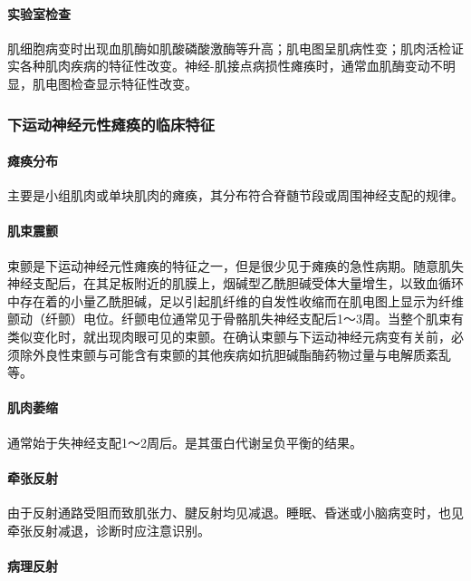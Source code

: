 \paragraph{实验室检查}

肌细胞病变时出现血肌酶如肌酸磷酸激酶等升高；肌电图呈肌病性变；肌肉活检证实各种肌肉疾病的特征性改变。神经-肌接点病损性瘫痪时，通常血肌酶变动不明显，肌电图检查显示特征性改变。

\subsubsection{下运动神经元性瘫痪的临床特征}

\paragraph{瘫痪分布}

主要是小组肌肉或单块肌肉的瘫痪，其分布符合脊髄节段或周围神经支配的规律。

\paragraph{肌束震颤}

束颤是下运动神经元性瘫痪的特征之一，但是很少见于瘫痪的急性病期。随意肌失神经支配后，在其足板附近的肌膜上，烟碱型乙酰胆碱受体大量增生，以致血循环中存在着的小量乙酰胆碱，足以引起肌纤维的自发性收缩而在肌电图上显示为纤维颤动（纤颤）电位。纤颤电位通常见于骨骼肌失神经支配后1～3周。当整个肌束有类似变化时，就出现肉眼可见的束颤。在确认束颤与下运动神经元病变有关前，必须除外良性束颤与可能含有束颤的其他疾病如抗胆碱酯酶药物过量与电解质紊乱等。

\paragraph{肌肉萎缩}

通常始于失神经支配1～2周后。是其蛋白代谢呈负平衡的结果。

\paragraph{牵张反射}

由于反射通路受阻而致肌张力、腱反射均见减退。睡眠、昏迷或小脑病变时，也见牵张反射减退，诊断时应注意识别。

\paragraph{病理反射}

